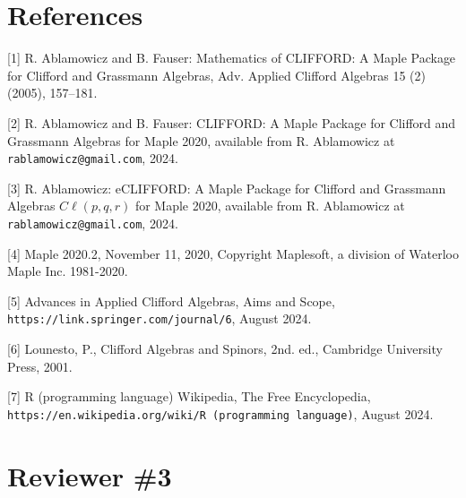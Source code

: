 \documentclass{article}
\newcommand{\cliff}[1]{\ensuremath{C\ell\left(#1\right)}}
\begin{document}
\section*{References}

\begin{description}
\item{[1]} R. Ablamowicz and B. Fauser: Mathematics of CLIFFORD: A Maple Package for Clifford and
Grassmann Algebras, Adv. Applied Clifford Algebras 15 (2) (2005), 157–181.\\
\item{[2]} R. Ablamowicz and B. Fauser: CLIFFORD: A Maple Package for Clifford and Grassmann
Algebras for Maple 2020, available from R. Ablamowicz at {\tt rablamowicz@gmail.com}, 2024.\\
\item{[3]} R. Ablamowicz: eCLIFFORD: A Maple Package for Clifford and Grassmann Algebras \cliff{p, q, r}
for Maple 2020, available from R. Ablamowicz at {\tt rablamowicz@gmail.com}, 2024.\\
\item{[4]} Maple 2020.2, November 11, 2020, Copyright Maplesoft, a division of Waterloo Maple Inc.
1981-2020.\\
\item{[5]} Advances in Applied Clifford Algebras, Aims and Scope,
{\tt https://link.springer.com/journal/6}, August 2024.\\
\item{[6]} Lounesto, P., Clifford Algebras and Spinors, 2nd. ed., Cambridge University Press, 2001.
\item{[7]} R (programming language) Wikipedia, The Free Encyclopedia,
{\tt https://en.wikipedia.org/wiki/R (programming language)}, August 2024.
\end{description}


\section*{Reviewer \#3}
\end{document}
